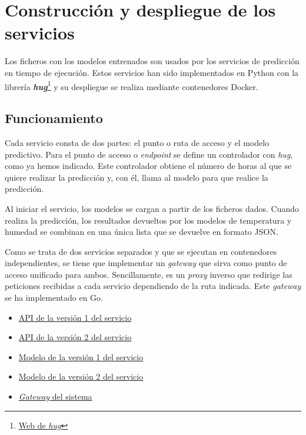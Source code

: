 \section{Construcción y despliegue de los servicios}
Los ficheros con los modelos entrenados son usados por los servicios
de predicción en tiempo de ejecución. Estos servicios han sido implementados
en Python con la librería \textbf{\textit{hug}}\footnote{\href{https://www.hug.rest/}{Web de \textit{hug}}}
y su despliegue se realiza mediante contenedores Docker.

\subsection{Funcionamiento}
Cada servicio consta de dos partes: el punto o ruta de acceso y el modelo
predictivo. Para el punto de acceso o \textit{endpoint} se define un
controlador con \textit{hug}, como ya hemos indicado. Este controlador
obtiene el número de horas al que se quiere realizar la predicción y,
con él, llama al modelo para que realice la predicción.

Al iniciar el servicio, los modelos se cargan a partir de los ficheros dados.
Cuando realiza la predicción, los resultados devueltos por los modelos
de temperatura y humedad se combinan en una única lista que se devuelve en
formato JSON.

Como se trata de dos servicios separados y que se ejecutan en contenedores
independientes, se tiene que implementar un \textit{gateway} que sirva como
punto de acceso unificado para ambos. Sencillamente, es un \textit{proxy}
inverso que redirige las peticiones recibidas a cada servicio dependiendo
de la ruta indicada. Este \textit{gateway} se ha implementado en Go.

\begin{itemize}
    \item\href{
        https://github.com/Varrrro/forecast/blob/master/src/v1/arima_rest.py
    }{API de la versión 1 del servicio}
    \item\href{
        https://github.com/Varrrro/forecast/blob/master/src/v2/autoreg_rest.py
    }{API de la versión 2 del servicio}
    \item\href{
        https://github.com/Varrrro/forecast/blob/master/src/v1/arima.py
    }{Modelo de la versión 1 del servicio}
    \item\href{
        https://github.com/Varrrro/forecast/blob/master/src/v2/autoreg.py
    }{Modelo de la versión 2 del servicio}
    \item\href{
        https://github.com/Varrrro/forecast/blob/master/src/gateway/gateway.go
    }{\textit{Gateway} del sistema}
\end{itemize}

